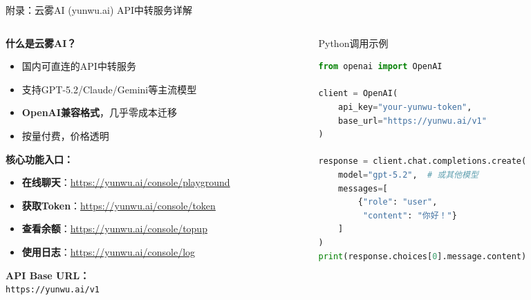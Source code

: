 \documentclass[aspectratio=169,11pt]{beamer}
\begin{document}
\begin{frame}[fragile]{附录：云雾AI (yunwu.ai) API中转服务详解}
    \begin{columns}
        \begin{column}{0.5\textwidth}
            \textbf{什么是云雾AI？}
            \begin{itemize}
                \item 国内可直连的API中转服务
                \item 支持GPT-5.2/Claude/Gemini等主流模型
                \item \textbf{OpenAI兼容格式}，几乎零成本迁移
                \item 按量付费，价格透明
            \end{itemize}
            
            \vspace{0.3cm}
            \textbf{核心功能入口：}
            \begin{itemize}
                \item \textbf{在线聊天}：\url{https://yunwu.ai/console/playground}
                \item \textbf{获取Token}：\url{https://yunwu.ai/console/token}
                \item \textbf{查看余额}：\url{https://yunwu.ai/console/topup}
                \item \textbf{使用日志}：\url{https://yunwu.ai/console/log}
            \end{itemize}
            
            \vspace{0.3cm}
            \textbf{API Base URL：}\\
            \texttt{https://yunwu.ai/v1}
        \end{column}
        \begin{column}{0.5\textwidth}
            \begin{exampleblock}{Python调用示例}
                \begin{lstlisting}[language=Python,basicstyle=\ttfamily\tiny]
from openai import OpenAI

client = OpenAI(
    api_key="your-yunwu-token",
    base_url="https://yunwu.ai/v1"
)

response = client.chat.completions.create(
    model="gpt-5.2",  # 或其他模型
    messages=[
        {"role": "user", 
         "content": "你好！"}
    ]
)
print(response.choices[0].message.content)
                \end{lstlisting}
            \end{exampleblock}
            

\end{column}
\end{columns}
\end{frame}
\end{document}
